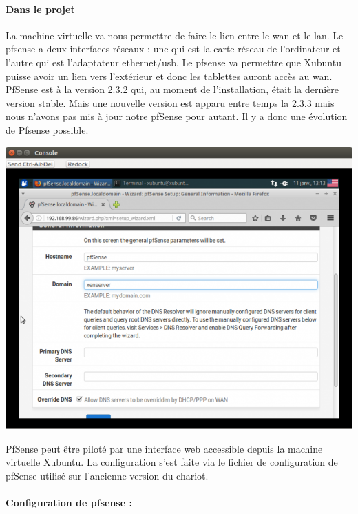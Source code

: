 \documentclass[a4paper,12pt]{extarticle}
\begin{document}
\paragraph{Dans le projet\\}

La machine virtuelle va nous permettre de faire le lien entre le wan et le lan. Le pfsense a deux interfaces réseaux : une qui est la carte réseau de l’ordinateur et l’autre qui est l’adaptateur ethernet/usb. Le pfsense va permettre que Xubuntu puisse avoir un lien vers l’extérieur et donc les tablettes auront accès au wan. 
PfSense est à la version 2.3.2 qui, au moment de l’installation, était la dernière version stable. Mais une nouvelle version est apparu entre temps la 2.3.3 mais nous n’avons pas mis à jour notre pfSense pour autant. Il y a donc une évolution de Pfsense possible. 

\begin{center}
\includegraphics[scale=0.65]{pfsense}\\
\end{center}

PfSense peut être piloté par une interface web accessible depuis la machine virtuelle Xubuntu. La configuration s’est faite via le fichier de configuration de pfSense utilisé sur l’ancienne version du chariot.

\paragraph{Configuration de pfsense :}
\end{document}
